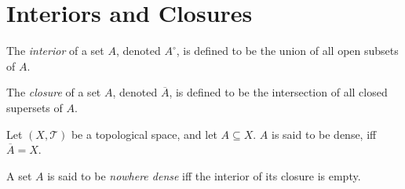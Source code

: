 \section{Interiors and Closures}


\begin{definition}
	[interiors]
	\label{def: interiors}
	The \textit{interior} of a set $A$, denoted $A^\circ$, is defined to be the union of all open subsets of $A$.
\end{definition}


\begin{definition}
	[closure]
	\label{def: closure}
	The \textit{closure} of a set $A$, denoted $\overline A$, is defined to be the intersection of all closed supersets of $A$.
\end{definition}


\begin{definition}
	\label{def: dense sets}
	Let $(X, \mathcal T)$ be a topological space, and let $A \subseteq X$. $A$ is said to be dense, iff $\overline A = X$.
\end{definition}


\begin{definition}
	\label{def: nowhere dense sets}
	A set $A$ is said to be \textit{nowhere dense} iff the interior of its closure is empty.
\end{definition}



